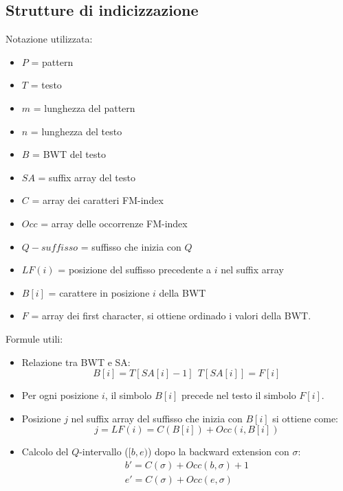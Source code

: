 \subsection{Strutture di indicizzazione}
Notazione utilizzata:
\begin{itemize}
    \item $P$ = pattern
    \item $T$ = testo
    \item $m$ = lunghezza del pattern
    \item $n$ = lunghezza del testo
    \item $B$ = BWT del testo
    \item $SA$ = suffix array del testo
    \item $C$ = array dei caratteri FM-index
    \item $Occ$ = array delle occorrenze FM-index
    \item $Q-suffisso$ = suffisso che inizia con $Q$
    \item $LF(i)$ = posizione del suffisso precedente a $i$ nel suffix array
    \item $B[i]$ = carattere in posizione $i$ della BWT
    \item $F$ = array dei first character, si ottiene ordinado i valori della BWT.
\end{itemize}
Formule utili:
\begin{itemize}
    \item Relazione tra BWT e SA:
          \begin{equation}
              B[i] = T[SA[i] - 1] \ \ T[SA[i]] = F[i]
          \end{equation}
    \item Per ogni posizione $i$, il simbolo $B[i]$ precede nel testo il simbolo $F[i]$.
    \item Posizione $j$ nel suffix array del suffisso che inizia con $B[i]$ si ottiene come:
          \begin{equation}
              j = LF(i) = C(B[i]) + Occ(i, B[i])
          \end{equation}
    \item Calcolo del $Q$-intervallo ($[b, e)$) dopo la backward extension con
          $\sigma$:
          \begin{equation}
              \begin{array}{l}
                  b' = C(\sigma) + Occ(b, \sigma) + 1 \\
                  e' = C(\sigma) + Occ(e, \sigma)
              \end{array}
          \end{equation}
\end{itemize}
